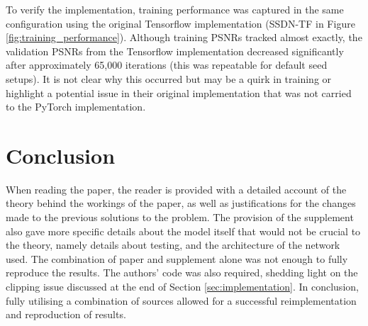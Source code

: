 \documentclass{article} %
\begin{document}
To verify the implementation, training performance was captured in the same configuration using the original Tensorflow implementation (SSDN-TF in Figure \ref{fig:training_performance}). Although training PSNRs tracked almost exactly, the validation PSNRs from the Tensorflow implementation decreased significantly after approximately 65,000 iterations (this was repeatable for default seed setups). It is not clear why this occurred but may be a quirk in training or highlight a potential issue in their original implementation that was not carried to the PyTorch implementation.

\section{Conclusion}
When reading the paper, the reader is provided with a detailed account of the theory behind the workings of the paper, as well as justifications for the changes made to the previous solutions to the problem. The provision of the supplement also gave more specific details about the model itself that would not be crucial to the theory, namely details about testing, and the architecture of the network used. The combination of paper and supplement alone was not enough to fully reproduce the results. The authors' code was also required, shedding light on the clipping issue discussed at the end of Section \ref{sec:implementation}. In conclusion, fully utilising a combination of sources allowed for a successful reimplementation and reproduction of results.



\end{document}
